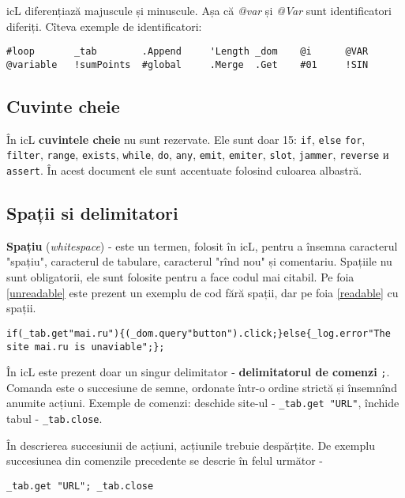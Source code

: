 icL diferențiază majuscule și minuscule. Așa că \textit{@var} și \textit{@Var} sunt identificatori diferiți. Cîteva exemple de identificatori:

\begin{lstlisting}[numbers=none]
#loop		_tab		.Append		'Length	_dom	@i	 	@VAR
@variable	!sumPoints	#global		.Merge	.Get	#01		!SIN
\end{lstlisting}

\subsection{Cuvinte cheie}

În icL \textbf{cuvintele cheie} nu sunt rezervate. Ele sunt doar 15: \lstinline`if`, \lstinline|else| \lstinline`for`, \lstinline`filter`, \lstinline`range`, \lstinline`exists`, \lstinline`while`, \lstinline`do`, \lstinline`any`, \lstinline`emit`, \lstinline`emiter`, \lstinline`slot`, \lstinline|jammer|, \lstinline|reverse| и \lstinline|assert|. În acest document ele sunt accentuate folosind culoarea albastră.

\subsection{Spații si delimitatori}

\textbf{Spațiu} (\textit{whitespace}) - este un termen, folosit în icL, pentru a însemna caracterul "spațiu", caracterul de tabulare, caracterul "rînd nou" și comentariu. Spațiile nu sunt obligatorii, ele sunt folosite pentru a face codul mai citabil. Pe foia \ref{unreadable} este prezent un exemplu de cod fără spații, dar pe foia \ref{readable} cu spații.

\begin{lstlisting}[caption=Cod fără spații,label=unreadable]
if(_tab.get"mai.ru"){(_dom.query"button").click;}else{_log.error"The site mai.ru is unaviable";};
\end{lstlisting}

În icL este prezent doar un singur delimitator - \textbf{delimitatorul de comenzi} \lstinline`;`. Comanda este o succesiune de semne, ordonate într-o ordine strictă și însemnînd anumite acțiuni. Exemple de comenzi: deschide site-ul - \lstinline`_tab.get "URL"`, închide tabul - \lstinline`_tab.close`.

În descrierea succesiunii de acțiuni, acțiunile trebuie despărțite. De exemplu succesiunea din comenzile precedente se descrie în felul următor -
\begin{lstlisting}[numbers=none]
_tab.get "URL"; _tab.close
\end{lstlisting}

